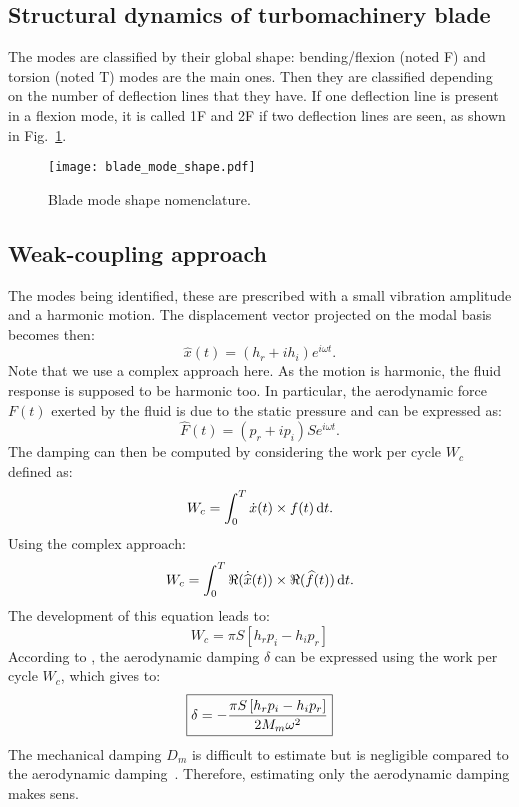 \subsection{Structural dynamics of turbomachinery blade}
\label{sub:structural_dynamics_of_turbomachinery_blade}

The modes are classified by their global shape: 
bending/flexion (noted F) and torsion (noted T) 
modes are the main ones. Then they are classified
depending on the number of deflection lines that they
have. If one deflection line is present in a flexion 
mode, it is called 1F and 2F if two deflection lines are
seen, as shown in Fig.~\ref{fig:blade_mode_shape}.
\begin{figure}[htp]
  \centering
  \texttt{[image: blade\_mode\_shape.pdf]}
  \caption{Blade mode shape nomenclature.}
  \label{fig:blade_mode_shape}
\end{figure}

\subsection{Weak-coupling approach}
\label{sub:weak_coupling_approach}

The modes being identified, these are prescribed
with a small vibration amplitude and a harmonic motion.
The displacement vector projected on the modal basis becomes then:
\begin{equation}
   \widehat{x}(t) = (h_r + i h_i) e^{i \omega t}.
\end{equation}
Note that we use a complex approach here.
As the motion is harmonic, the fluid response is
supposed to be harmonic too.
In particular, the aerodynamic force $F (t)$ exerted by the fluid is due to the
static pressure and can be expressed as:
\begin{equation}
    \widehat{F}(t) = (p_r + i p_i) S e^{i \omega t}.
\end{equation}
The damping can then be computed by considering the 
work per cycle $W_c$ defined as:
\begin{equation}
    W_c = \int_0^T \dot{x} (t) \times f(t) \mathop{}\!\mathrm{d} t.
\end{equation}
Using the complex approach:
\begin{equation}
    W_c = \int_0^T \Re (\dot{\widehat{x}} (t)) \times \Re (\widehat{f}(t)) \mathop{}\!\mathrm{d} t.
\end{equation}
The development of this equation leads to:
\begin{equation}
    W_c = \pi S \left[h_r p_i - h_i p_r \right]
\end{equation}
According to \citet{Carta1967}, the aerodynamic 
damping $\delta$ can be expressed using the
work per cycle $W_c$, which gives to:
\begin{equation}
    \fbox{$
    \delta = - \displaystyle \frac{\pi S \left[h_r p_i - h_i p_r \right]}{2 M_m \omega^2}
    $}
\end{equation}
The mechanical damping $D_m$ is difficult to estimate
but is negligible compared to the aerodynamic damping~\cite{Mikolajczak1975}.
Therefore, estimating only the aerodynamic damping makes sens.

